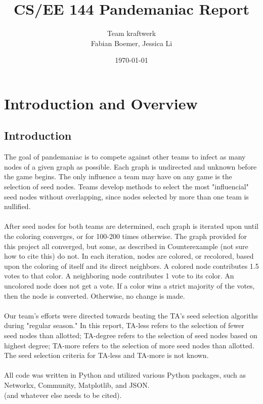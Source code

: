 \documentclass[letterpaper, 11pt]{article}
\begin{document}
\title{CS/EE 144 Pandemaniac Report}
\author{Team kraftwerk \\Fabian Boemer, Jessica Li}
\date{\today}
\maketitle


\section{Introduction and Overview}
\subsection{Introduction}
The goal of pandemaniac is to compete against other teams to infect as many nodes of a given graph as possible. Each graph is undirected and unknown before the game begins. The only influence a team may have on any game is the selection of seed nodes. Teams develop methods to select the most "influencial" seed nodes without overlapping, since nodes selected by more than one team is nullified.
\\\\
After seed nodes for both teams are determined, each graph is iterated upon until the coloring converges, or for 100-200 times otherwise. The graph provided for this project all converged, but some, as described in Counterexample (not sure how to cite this) do not. In each iteration, nodes are colored, or recolored, based upon the coloring of itself and its direct neighbors. A colored node contributes 1.5 votes to that color. A neighboring node contributes 1 vote to its color. An uncolored node does not get a vote. If a color wins a strict majority of the votes, then the node is converted. Otherwise, no change is made.
\\\\
Our team's efforts were directed towards beating the TA's seed selection algoriths during "regular season." In this report, TA-less refers to the selection of fewer seed nodes than allotted; TA-degree refers to the selection of seed nodes based on highest degree; TA-more refers to the selection of more seed nodes than allotted. The seed selection criteria for TA-less and TA-more is not known. 
\\\\
All code was written in Python and utilized various Python packages, such as Networkx, Community, Matplotlib, and JSON. 
\\
\cite{networkx} (and whatever else needs to be cited).
\end{document}
